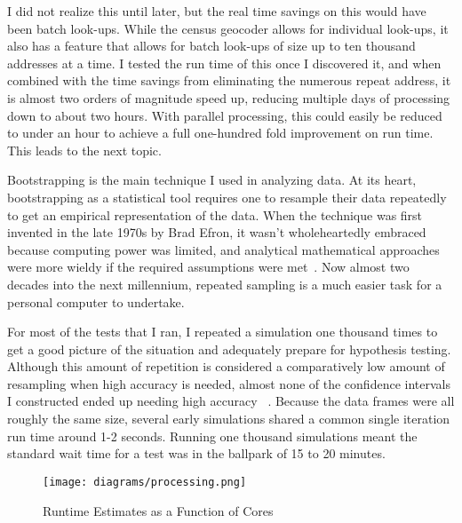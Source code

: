 \par I did not realize this until later, but the real time savings on this would have been batch look-ups.  While the census geocoder allows for individual look-ups, it also has a feature that allows for batch look-ups of size up to ten thousand addresses at a time.  I tested the run time of this once I discovered it, and when combined with the time savings from eliminating the numerous repeat address, it is almost two orders of magnitude speed up, reducing multiple days of processing down to about two hours.  With parallel processing, this could easily be reduced to under an hour to achieve a full one-hundred fold improvement on run time.  This leads to the next topic.

\par Bootstrapping is the main technique I used in analyzing data.  At its heart, bootstrapping as a statistical tool requires one to resample their data repeatedly to get an empirical representation of the data.  When the technique was first invented in the late 1970s by Brad Efron, it wasn’t wholeheartedly embraced because computing power was limited, and analytical mathematical approaches were more wieldy if the required assumptions were met~\citep{WEBSITE:16}.  Now almost two decades into the next millennium, repeated sampling is a much easier task for a personal computer to undertake.

\par For most of the tests that I ran, I repeated a simulation one thousand times to get a good picture of the situation and adequately prepare for hypothesis testing.  Although this amount of repetition is considered a comparatively low amount of resampling when high accuracy is needed, almost none of the confidence intervals I constructed ended up needing high accuracy ~\citep{BOOK:3}.  Because the data frames were all roughly the same size, several early simulations shared a common single iteration run time around 1-2 seconds.  Running one thousand simulations meant the standard wait time for a test was in the ballpark of 15 to 20 minutes.

\begin{wrapfigure}{r}{2in}
\texttt{[image: diagrams/processing.png]}
\caption{Runtime Estimates as a Function of Cores}
\label{fig:figure1c}
\end{wrapfigure}

